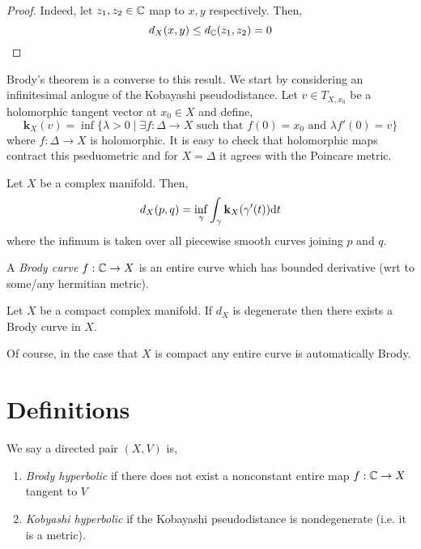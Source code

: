 \documentclass[12pt]{article}
\begin{document}
\begin{proof}
Indeed, let $z_1, z_2 \in \mathbb{C}$ map to $x,y$ respectively. Then,
\[ d_X(x,y) \le d_{\mathbb{C}}(z_1, z_2) = 0 \]
\end{proof}

\newcommand{\kk}{\mathbf{k}}

Brody's theorem is a converse to this result. We start by considering an infinitesimal anlogue of the Kobayashi pseudodistance. Let $v \in T_{X, x_0}$ be a holomorphic tangent vector at $x_0 \in X$ and define,
\[ \kk_X(v) = \inf \{ \lambda > 0 \mid \exists f : \Delta \to X \text{ such that } f(0) = x_0 \text{ and } \lambda f'(0) = v \} \]
where $f : \Delta \to X$ is holomorphic. It is easy to check that holomorphic maps contract this pseduometric and for $X = \Delta$ it agrees with the Poincare metric.

\begin{theorem}
Let $X$ be a complex manifold. Then,
\[ d_X(p,q) = \inf_\gamma \int_\gamma \kk_X(\gamma'(t)) \d{t} \]
where the infimum is taken over all piecewise smooth curves joining $p$ and $q$.
\end{theorem}

\begin{defn}
A \textit{Brody curve} $f : \mathbb{C} \to X$ is an entire curve which has bounded derivative (wrt to some/any hermitian metric).
\end{defn}

\begin{theorem}[Brody]
Let $X$ be a compact complex manifold. If $d_X$ is degenerate then there exists a Brody curve in $X$.
\end{theorem}

\begin{rmk}
Of course, in the case that $X$ is compact any entire curve is automatically Brody.
\end{rmk}



\section{Definitions}

\begin{defn}
We say a directed pair $(X, V)$ is,
\begin{enumerate}
\item \textit{Brody hyperbolic} if there does not exist a nonconstant entire map $f : \mathbb{C} \to X$ tangent to $V$
\item \textit{Kobyashi hyperbolic} if the Kobayashi pseudodistance is nondegenerate (i.e. it is a metric).
\end{enumerate}
\end{defn}
\end{document}
